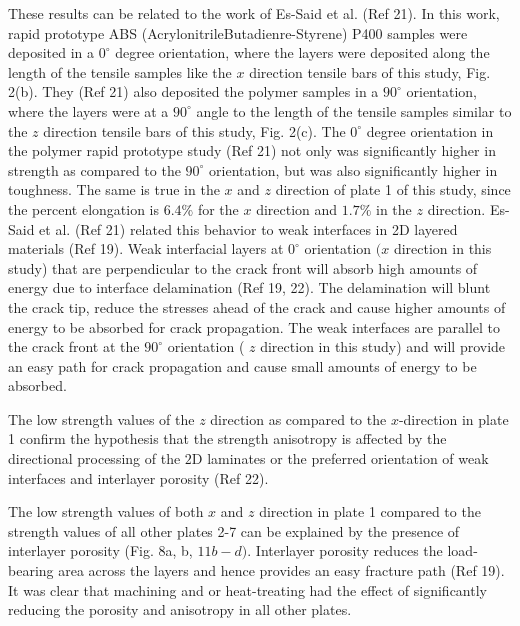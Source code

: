 \documentclass[10pt]{article}
\begin{document}
These results can be related to the work of Es-Said et al. (Ref 21). In this work, rapid prototype ABS (AcrylonitrileButadienre-Styrene) P400 samples were deposited in a $0^{\circ}$ degree orientation, where the layers were deposited along the length of the tensile samples like the $x$ direction tensile bars of this study, Fig. 2(b). They (Ref 21) also deposited the polymer samples in a $90^{\circ}$ orientation, where the layers were at a $90^{\circ}$ angle to the length of the tensile samples similar to the $z$ direction tensile bars of this study, Fig. 2(c). The $0^{\circ}$ degree orientation in the polymer rapid prototype study (Ref 21) not only was significantly higher in strength as compared to the $90^{\circ}$ orientation, but was also significantly higher in toughness. The same is true in the $x$ and $z$ direction of plate 1 of this study, since the percent elongation is $6.4 \%$ for the $x$ direction and $1.7 \%$ in the $z$ direction. Es-Said et al. (Ref 21) related this behavior to weak interfaces in 2D layered materials (Ref 19). Weak interfacial layers at $0^{\circ}$ orientation $(x$ direction in this study) that are perpendicular to the crack front will absorb high amounts of energy due to interface delamination (Ref 19, 22). The delamination will blunt the crack tip, reduce the stresses ahead of the crack and cause higher amounts of energy to be absorbed for crack propagation. The weak interfaces are parallel to the crack front at the $90^{\circ}$ orientation ( $z$ direction in this study) and will provide an easy path for crack propagation and cause small amounts of energy to be absorbed.

The low strength values of the $z$ direction as compared to the $x$-direction in plate 1 confirm the hypothesis that the strength anisotropy is affected by the directional processing of the $2 \mathrm{D}$ laminates or the preferred orientation of weak interfaces and interlayer porosity (Ref 22).

The low strength values of both $x$ and $z$ direction in plate 1 compared to the strength values of all other plates 2-7 can be explained by the presence of interlayer porosity (Fig. 8a, b, $11 b-d)$. Interlayer porosity reduces the load-bearing area across the layers and hence provides an easy fracture path (Ref 19). It was clear that machining and or heat-treating had the effect of significantly reducing the porosity and anisotropy in all other plates.
\end{document}
